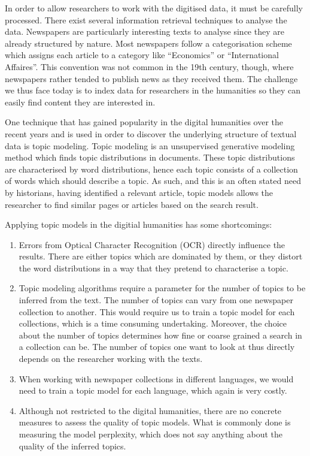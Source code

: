 In order to allow researchers to work with the digitised data, it must be carefully processed. There exist several information retrieval techniques to analyse the data. Newspapers are particularly interesting texts to analyse since they are already structured by nature. Most newspapers follow a categorisation scheme which assigns each article to a category like ``Economics'' or ``International Affaires''. This convention was not common in the 19th century, though, where newspapers rather tended to publish news as they received them. The challenge we thus face today is to index data for researchers in the humanities so they can easily find content they are interested in. 

One technique that has gained popularity in the digital humanities over the recent years and is used in order to discover the underlying structure of textual data is topic modeling. Topic modeling is an unsupervised generative modeling method which finds topic distributions in documents. These topic distributions are characterised by word distributions, hence each topic consists of a collection of words which should describe a topic. As such, and this is an often stated need by historians, having identified a relevant article, topic models allows the researcher to find similar pages or articles based on the search result.

Applying topic models in the digitial humanities has some shortcomings: 

\begin{enumerate}
    \item Errors from Optical Character Recognition (OCR) directly influence the results. There are either topics which are dominated by them, or they distort the word distributions in a way that they pretend to characterise a topic.
    \item Topic modeling algorithms require a parameter for the number of topics to be inferred from the text. The number of topics can vary from one newspaper collection to another. This would require us to train a topic model for each collections, which is a time consuming undertaking. Moreover, the choice about the number of topics determines how fine or coarse grained a search in a collection can be. The number of topics one want to look at thus directly depends on the researcher working with the texts.
    \item When working with newspaper collections in different languages, we would need to train a topic model for each language, which again is very costly.
    \item Although not restricted to the digital humanities, there are no concrete measures to assess the quality of topic models. What is commonly done is measuring the model perplexity, which does not say anything about the quality of the inferred topics.
\end{enumerate}



